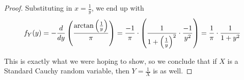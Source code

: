 \documentclass{exam}
\begin{document}
\begin{questions}
\begin{parts}
\begin{proof}
        Substituting in $x = \frac{1}{y}$, we end up with 
        $$f_Y(y) = -\frac{d}{dy} \left( \frac{\arctan \left( \frac{1}{y} \right)}{\pi} \right) = \frac{-1}{\pi} \cdot \left( \frac{1}{1 + \left( \frac{1}{y} \right)^2} \cdot \frac{-1}{y^2} \right) = \frac{1}{\pi} \cdot \frac{1}{1 + y^2}$$

        This is exactly what we were hoping to show, so we conclude that if $X$ is a Standard Cauchy random variable, then $Y = \frac{1}{X}$ is as well.
    \end{proof}
\end{parts}
\end{questions}
\end{document}
